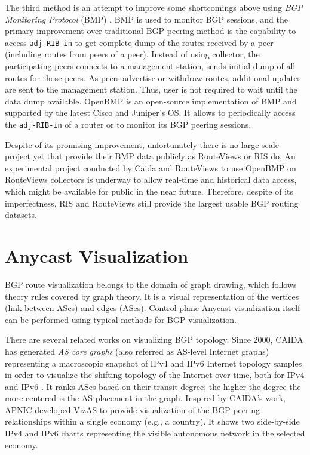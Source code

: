 
The third method is an attempt to improve some shortcomings above using \textit{BGP Monitoring Protocol} (BMP) \cite{ietf-bmp}. BMP is used to monitor BGP sessions, and the primary improvement over traditional BGP peering method is the capability to access \texttt{adj-RIB-in} to get complete dump of the routes received by a peer (including routes from peers of a peer). Instead of using collector, the participating peers connects to a management station, sends initial dump of all routes for those peers. As peers advertise or withdraw routes, additional updates are sent to the management station. Thus, user is not required to wait until the data dump available. OpenBMP \cite{openbmp} is an open-source implementation of BMP and supported by the latest Cisco and Juniper's OS. It allows to periodically access the \texttt{adj-RIB-in} of a router or to monitor its BGP peering sessions. 

Despite of its promising improvement, unfortunately there is no large-scale project yet that provide their BMP data publicly as RouteViews or RIS do. An experimental project conducted by Caida and RouteViews \cite{caida-bmp} to use OpenBMP on RouteViews collectors is underway to allow real-time and historical data access, which might be available for public in the near future. Therefore, despite of its imperfectness, RIS and RouteViews still provide the largest usable BGP routing datasets.


\section{Anycast Visualization}
\label{ch02:visualization}
BGP route visualization belongs to the domain of graph drawing, which follows theory rules covered by graph theory. It is a visual representation of the vertices (link between ASes) and edges (ASes). Control-plane Anycast visualization itself can be performed using typical methods for BGP visualization. 

There are several related works on visualizing BGP topology. Since 2000, CAIDA has generated \textit{AS core graphs} (also referred as AS-level Internet graphs) representing a macroscopic snapshot of IPv4 and IPv6 Internet topology samples in order to visualize the shifting topology of the Internet over time, both for IPv4 and IPv6 \cite{caida-vis}. It ranks ASes based on their transit degree; the higher the degree the more centered is the AS placement in the graph. Inspired by CAIDA's work, APNIC developed VizAS \cite{vizas} to provide visualization of the BGP peering relationships within a single economy (e.g., a country). It shows two side-by-side IPv4 and IPv6 charts representing the visible autonomous network in the selected economy.

